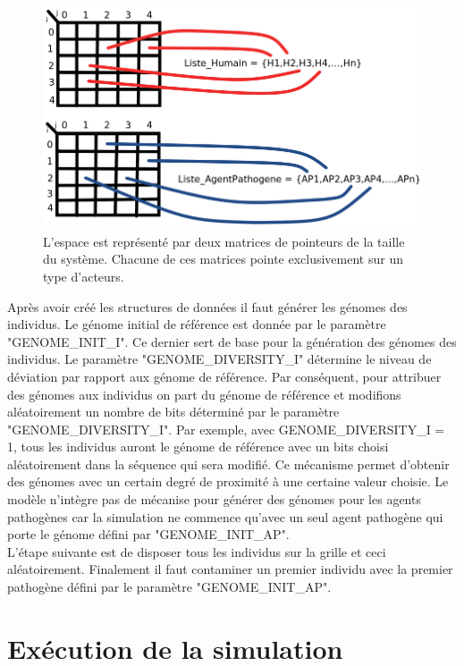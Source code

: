 \begin{figure}[h]
\centering
\captionsetup{justification=centering}
\includegraphics[scale=0.4]{Images/MatricesPointeurs.png}
\caption[Matrices de pointeurs]{L'espace est représenté par deux matrices de pointeurs de la taille du système. Chacune de ces matrices pointe exclusivement sur un type d'acteurs.}
\end{figure}

Après avoir créé les structures de données il faut générer les génomes des individus. Le génome initial de référence est donnée par le paramètre "GENOME\_INIT\_I". Ce dernier sert de base pour la génération des génomes des individus. Le paramètre "GENOME\_DIVERSITY\_I" détermine le niveau de déviation par rapport aux génome de référence. Par conséquent, pour attribuer des génomes aux individus on part du génome de référence et modifions aléatoirement un nombre de bits déterminé par le paramètre "GENOME\_DIVERSITY\_I". Par exemple, avec GENOME\_DIVERSITY\_I = 1, tous les individus auront le génome de référence avec un bits choisi aléatoirement dans la séquence qui sera modifié. Ce mécanisme permet d'obtenir des génomes avec un certain degré de proximité à une certaine valeur choisie. Le modèle n'intègre pas de mécanise pour générer des génomes pour les agents pathogènes car la simulation ne commence qu'avec un seul agent pathogène qui porte le génome défini par "GENOME\_INIT\_AP".\\

L'étape suivante est de disposer tous les individus sur la grille et ceci aléatoirement. Finalement il faut contaminer un premier individu avec la premier pathogène défini par le paramètre "GENOME\_INIT\_AP". 

\section{Exécution de la simulation}

